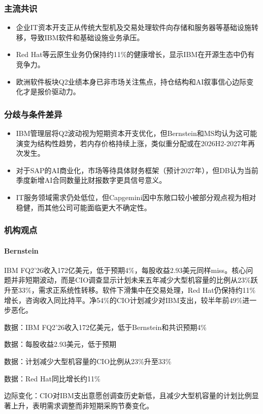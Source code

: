 \documentclass[11pt]{ctexart}
\begin{document}
\subsubsection*{主流共识}
\begin{itemize}
  \item 企业IT资本开支正从传统大型机及交易处理软件向存储和服务器等基础设施转移，导致IBM软件和基础设施业务承压。
  \item Red Hat等云原生业务仍保持约11\%的健康增长，显示IBM在开源生态中仍有竞争力。
  \item 欧洲软件板块Q2业绩本身已非市场关注焦点，持仓结构和AI叙事信心边际变化才是报价驱动力。
\end{itemize}
\subsubsection*{分歧与条件差异}
\begin{itemize}
  \item IBM管理层将Q2波动视为短期资本开支优化，但Bernstein和MS均认为这可能演变为结构性趋势，若内存价格持续上涨，类似重分配或在2026H2-2027年再次发生。
  \item 对于SAP的AI商业化，市场等待具体财务框架（预计2027年），但DB认为当前季度新增AI合同数量比财报数字更具信号意义。
  \item IT服务领域需求仍处低位，但Capgemini因中东敞口较小被部分观点视为相对稳健，而其他公司可能面临更大不确定性。
\end{itemize}
\subsubsection*{机构观点}
\paragraph{Bernstein} IBM FQ2'26收入172亿美元，低于预期4\%，每股收益2.93美元同样miss。核心问题并非短期波动，而是CIO调查显示计划未来五年减少大型机容量的比例从23\%跃升至33\%，需求正系统性转移。软件下滑集中在交易处理，Red Hat仍保持约11\%增长，咨询收入同比持平。净54\%的CIO计划减少对IBM支出，较半年前49\%进一步恶化。
{\small\color{refgray}数据：IBM FQ2'26收入172亿美元，低于Bernstein和共识预期4\%\par}
{\small\color{refgray}数据：每股收益2.93美元，低于预期\par}
{\small\color{refgray}数据：计划减少大型机容量的CIO比例从23\%升至33\%\par}
{\small\color{refgray}数据：Red Hat同比增长约11\%\par}
{\small\color{refgray}边际变化：CIO对IBM支出意愿创调查历史新低，且减少大型机容量的计划比例显著上升，表明需求调整而非短期采购节奏变化。\par}
\end{document}
